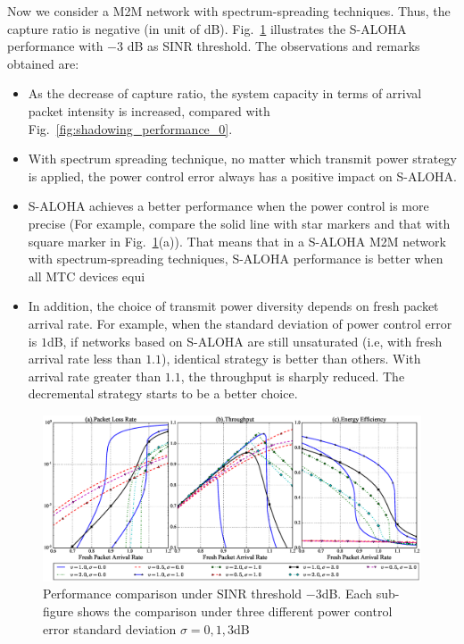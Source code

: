 Now we consider a M2M network with spectrum-spreading techniques. Thus, the capture ratio is negative (in unit of dB). Fig.~\ref{fig:shadowing_performance_-3} illustrates the S-ALOHA performance with $-3$ dB as SINR threshold. The observations and remarks obtained are:
\begin{itemize}[leftmargin=*, noitemsep]
	\item As the decrease of capture ratio, the system capacity in terms of arrival packet intensity is increased, compared with Fig.~\ref{fig:shadowing_performance_0}.
	\item With spectrum spreading technique, no matter which transmit power strategy is applied, the power control error always has a positive impact on S-ALOHA. 
	\item S-ALOHA achieves a better performance when the power control is more precise (For example, compare the solid line with star markers and that with square marker in Fig.~\ref{fig:shadowing_performance_-3}(a)). That means that in a S-ALOHA M2M network with spectrum-spreading techniques, S-ALOHA performance is better when all MTC devices equi
	\item In addition, the choice of transmit power diversity depends on fresh packet arrival rate. For example, when the standard deviation of power control error is $1$dB, if networks based on S-ALOHA are still unsaturated (i.e, with fresh arrival rate less than $1.1$), identical strategy is better than others. With arrival rate greater than $1.1$, the throughput  is sharply reduced. The decremental strategy starts to be a better choice.
\end{itemize}

\begin{figure}[!th]
	\centering
	\includegraphics[width=1.0\linewidth]{Chapter4/Figures/shadowing_performance_case_-3.0.eps}
	\caption{Performance comparison under SINR threshold $-3$dB. Each sub-figure shows the comparison under three different power control error standard deviation $\sigma = 0, 1, 3$dB}
	\label{fig:shadowing_performance_-3}
\end{figure}


